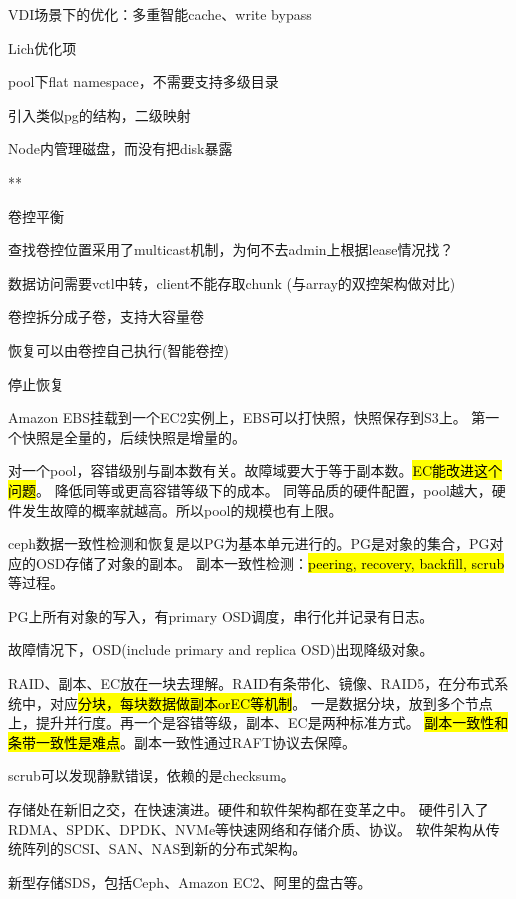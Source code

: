 VDI场景下的优化：多重智能cache、write bypass

Lich优化项
\begin{enumbox}
\item pool下flat namespace，不需要支持多级目录
\item 引入类似pg的结构，二级映射
\item Node内管理磁盘，而没有把disk暴露
\item ***
\item 卷控平衡
\item 查找卷控位置采用了multicast机制，为何不去admin上根据lease情况找？
\item 数据访问需要vctl中转，client不能存取chunk (与array的双控架构做对比)
\item 卷控拆分成子卷，支持大容量卷
\item 恢复可以由卷控自己执行(智能卷控)
\item 停止恢复
\end{enumbox}

\hrulefill

Amazon EBS挂载到一个EC2实例上，EBS可以打快照，快照保存到S3上。
第一个快照是全量的，后续快照是增量的。

对一个pool，容错级别与副本数有关。故障域要大于等于副本数。\hl{EC能改进这个问题}。
降低同等或更高容错等级下的成本。
同等品质的硬件配置，pool越大，硬件发生故障的概率就越高。所以pool的规模也有上限。

ceph数据一致性检测和恢复是以PG为基本单元进行的。PG是对象的集合，PG对应的OSD存储了对象的副本。
副本一致性检测：\hl{peering, recovery, backfill, scrub}等过程。

PG上所有对象的写入，有primary OSD调度，串行化并记录有日志。

故障情况下，OSD(include primary and replica OSD)出现降级对象。

\hrulefill

RAID、副本、EC放在一块去理解。RAID有条带化、镜像、RAID5，在分布式系统中，对应\hl{分块，每块数据做副本orEC等机制}。
一是数据分块，放到多个节点上，提升并行度。再一个是容错等级，副本、EC是两种标准方式。
\hl{副本一致性和条带一致性是难点}。副本一致性通过RAFT协议去保障。

scrub可以发现静默错误，依赖的是checksum。

存储处在新旧之交，在快速演进。硬件和软件架构都在变革之中。
硬件引入了RDMA、SPDK、DPDK、NVMe等快速网络和存储介质、协议。
软件架构从传统阵列的SCSI、SAN、NAS到新的分布式架构。

新型存储SDS，包括Ceph、Amazon EC2、阿里的盘古等。

